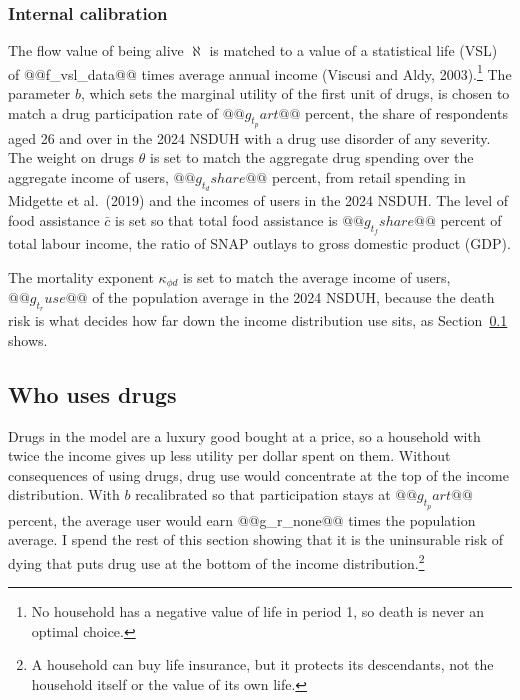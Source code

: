 \documentclass[10pt]{article}
\begin{document}
\subsubsection{Internal calibration}

The flow value
of being alive $\aleph$ is matched to a value of a statistical life (VSL) of @@f_vsl_data@@
times average annual income (Viscusi and Aldy, 2003).\footnote{No household has a negative value of life in period 1, so death is never an optimal choice.} The parameter $b$, which sets the marginal utility of the first unit of drugs, is chosen to match a drug participation rate of
$@@g_t_part@@$ percent, the share of respondents aged 26 and over in the 2024 NSDUH with a drug use disorder of any severity. The weight on drugs $\theta$ is set to match the aggregate drug spending over the
aggregate income of users, $@@g_t_dshare@@$ percent, from retail spending in Midgette et al.\ (2019) and the incomes of users in
the 2024 NSDUH. The level of food assistance $\bar c$ is set so that total food assistance is $@@g_t_fshare@@$ percent of total labour income, the ratio of SNAP outlays to gross domestic product (GDP).

The mortality exponent $\kappa_{\phi d}$ is set to match the average income of users,
$@@g_t_ruse@@$ of the population average in the 2024 NSDUH, because the death risk is what decides how far down
the income distribution use sits, as Section~\ref{sec:who} shows.

\begin{table}[!tb]
\centering
\caption{Externally set parameters}\label{tab:ext}
\sbox{\ntbox}{}\usebox{\ntbox}
\end{table}

\begin{table}[!tb]
\centering
\caption{Internally calibrated parameters}\label{tab:int}
\sbox{\ntbox}{}\usebox{\ntbox}
\end{table}

\subsection{Who uses drugs}\label{sec:who}

Drugs in the model are a luxury good bought at a price, so a household with
twice the income gives up less utility per dollar spent on them.   Without consequences of using drugs, drug use would concentrate at the top of the income distribution. With $b$ recalibrated so that participation stays at $@@g_t_part@@$ percent, the average user would earn @@g_r_none@@ times the population average. I spend the rest of this section showing that it is the uninsurable risk of dying that puts drug use at the bottom of the income distribution.\footnote{A household can buy life insurance, but it protects its descendants, not the household itself or the value of its own life.}
\end{document}

